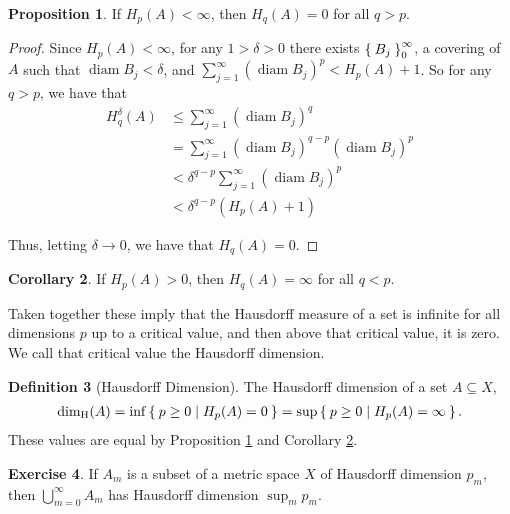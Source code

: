 \documentclass[11pt]{amsart}
\theoremstyle{definition}
\newtheorem{definition}{Definition}[section]
\newtheorem{prop}[definition]{Proposition}
\newtheorem{cor}[definition]{Corollary}
\newtheorem{ex}[definition]{Exercise}
\DeclareMathOperator{\diam}{diam}
\DeclareMathOperator{\dimH}{dim_H}
\begin{document}
\begin{prop} \label{prop:critval}
	If \( H_p \left( A \right) < \infty \), then \( H_q \left( A \right) = 0 \) for all \( q > p \).
\end{prop}

\begin{proof}
	Since \( H_p \left( A \right) < \infty \), for any \( 1 > \delta > 0 \) there exists \( \Set{B_j}_0^\infty \), a covering of \(A\) such that \( \diam B_j < \delta \), and \( \sum_{j = 1}^{\infty} \left( \diam B_j \right)^p < H_p \left( A \right) + 1 \). So for any \( q > p \), we have that 
	\begin{align}
		H^\delta_q \left( A \right) 
		& \leq \sum_{j = 1}^{\infty} \left( \diam B_j \right)^q \\
		& = \sum_{j = 1}^{\infty} \left( \diam B_j \right)^{q - p} \left( \diam B_j \right)^{p} \\
		& < \delta^{q - p} \sum_{j = 1}^{\infty} \left( \diam B_j \right)^{p} \\
		& < \delta^{q - p} \left( H_p  \left( A \right) + 1 \right)
	\end{align}
	
	Thus, letting \( \delta \rightarrow 0 \), we have that \( H_q \left( A \right) = 0 \).
\end{proof}
	
\begin{cor} \label{prop:critval:cor}
	If \( H_p \left( A \right) > 0 \), then \( H_q \left( A \right) = \infty \) for all \( q < p \).
\end{cor}

Taken together these imply that the Hausdorff measure of a set is infinite for all dimensions \( p \) up to a critical value, and then above that critical value, it is zero. We call that critical value the Hausdorff dimension.

\begin{definition}[Hausdorff Dimension]
	The Hausdorff dimension of a set \( A \subseteq X \), 
	\begin{align}
		\dimH (A) 
		= \inf \Set{ p \geq 0 | H_p(A) = 0 }
		= \sup \Set{ p \geq 0 | H_p(A) = \infty }.
	\end{align}
	These values are equal by Proposition \ref{prop:critval} and Corollary \ref{prop:critval:cor}.
\end{definition}

\begin{ex}
	If \( A_m \) is a subset of a metric space \( X \) of Hausdorff dimension \( p_m \), then \( \bigcup_{m = 0}^\infty A_m \) has Hausdorff dimension \( \sup_{m} p_m\).
\end{ex}
\end{document}
